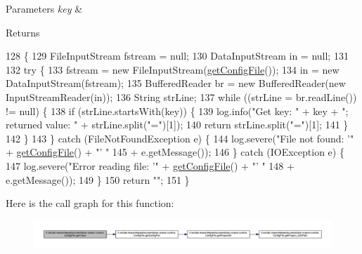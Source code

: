 \begin{DoxyParams}{Parameters}
{\em key} & \\
\hline
\end{DoxyParams}
\begin{DoxyReturn}{Returns}

\end{DoxyReturn}

\begin{DoxyCode}
128                                               \{
129         FileInputStream fstream = null;
130         DataInputStream in = null;
131 
132         \textcolor{keywordflow}{try} \{
133             fstream = \textcolor{keyword}{new} FileInputStream(\hyperlink{classit_1_1isislab_1_1masonhelperdocumentation_1_1mason_1_1control_1_1_config_file_ac533dd01e862be359ae060d278daf1ea}{getConfigFile}());
134             in = \textcolor{keyword}{new} DataInputStream(fstream);
135             BufferedReader br = \textcolor{keyword}{new} BufferedReader(\textcolor{keyword}{new} InputStreamReader(in));
136             String strLine;
137             \textcolor{keywordflow}{while} ((strLine = br.readLine()) != null) \{
138                 \textcolor{keywordflow}{if} (strLine.startsWith(key)) \{
139                     log.info(\textcolor{stringliteral}{"Get key: "} + key + \textcolor{stringliteral}{"; returned value: "} + strLine.split(\textcolor{stringliteral}{"="})[1]);
140                     \textcolor{keywordflow}{return} strLine.split(\textcolor{stringliteral}{"="})[1];
141                 \}
142             \}
143         \} \textcolor{keywordflow}{catch} (FileNotFoundException e) \{
144             log.severe(\textcolor{stringliteral}{"File not found: '"} + \hyperlink{classit_1_1isislab_1_1masonhelperdocumentation_1_1mason_1_1control_1_1_config_file_ac533dd01e862be359ae060d278daf1ea}{getConfigFile}() + \textcolor{stringliteral}{"' "}
145                     + e.getMessage());
146         \} \textcolor{keywordflow}{catch} (IOException e) \{
147             log.severe(\textcolor{stringliteral}{"Error reading file: '"} + \hyperlink{classit_1_1isislab_1_1masonhelperdocumentation_1_1mason_1_1control_1_1_config_file_ac533dd01e862be359ae060d278daf1ea}{getConfigFile}() + \textcolor{stringliteral}{"' "}
148                     + e.getMessage());
149         \}
150         \textcolor{keywordflow}{return} \textcolor{stringliteral}{""};
151     \}
\end{DoxyCode}


Here is the call graph for this function\-:\nopagebreak
\begin{figure}[H]
\begin{center}
\leavevmode
\includegraphics[width=350pt]{classit_1_1isislab_1_1masonhelperdocumentation_1_1mason_1_1control_1_1_config_file_a7bcf08b34e48f0c5116d796d616113f0_cgraph}
\end{center}
\end{figure}




